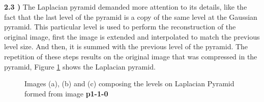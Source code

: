 \documentclass[12pt,a4paper]{article}
\begin{document}
\textbf{2.3 )} The Laplacian pyramid demanded more attention to its details, like the fact that the last level of the pyramid is a copy of the same level at the Gaussian pyramid. This particular level is used to perform the reconstruction of the original image, first the image is extended and interpolated to match the previous level size. And then, it is summed with the previous level of the pyramid. The repetition of these steps results on the original image that was compressed in the pyramid, Figure \ref{fig:placePyramid} shows the Laplacian pyramid. \\

\begin{figure}[!h]
	\centering
	\quad
	\quad
	\caption{Images (a), (b) and (c) composing the levels on Laplacian Pyramid formed from image \textbf{p1-1-0}}
	\label{fig:placePyramid}
\end{figure}
\end{document}
